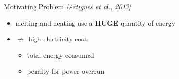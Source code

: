 \begin{frame}{Motivating Problem
 {\small \it \color{gray!50!black!50} [Artigues et al., 2013]}}
\begin{block}{}
\begin{center}
  \end{center}
\end{block}
\vfill
\pause
  \begin{itemize}
  \item melting and heating use a {\bf HUGE} quantity of energy
\vfill
\pause
  \item $\Rightarrow$ high electricity cost:
    \begin{itemize}
    \item total energy consumed
    \item penalty for power overrun
    \end{itemize}
  \end{itemize}
\end{frame}



